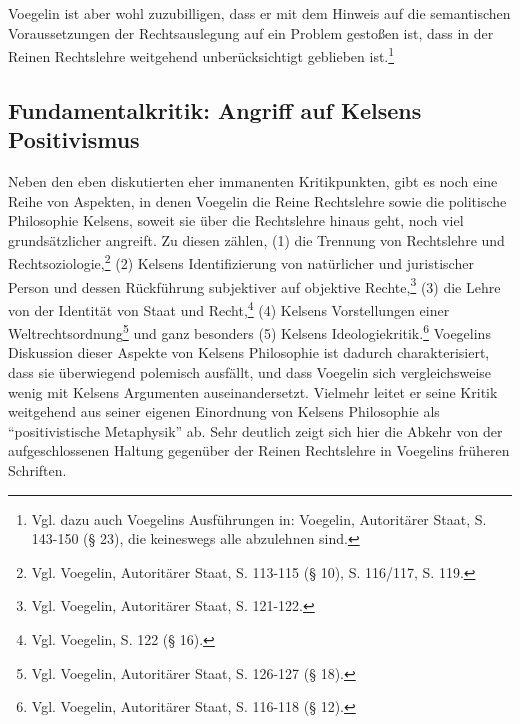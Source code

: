 \documentclass[12pt,a4paper,ngerman]{article}
\begin{document}
Voegelin ist aber wohl zuzubilligen, dass er mit dem Hinweis auf die
semantischen Voraussetzungen der Rechtsauslegung auf ein Problem gestoßen ist,
dass in der Reinen Rechtslehre weitgehend unberücksichtigt geblieben
ist.\footnote{Vgl. dazu auch Voegelins Ausführungen in: Voegelin, Autoritärer
  Staat, S.  143-150 (§ 23), die keineswegs alle abzulehnen sind.}

\subsection{Fundamentalkritik: Angriff auf Kelsens Positivismus}

Neben den eben diskutierten eher immanenten Kritikpunkten, gibt es noch eine
Reihe von Aspekten, in denen Voegelin die Reine Rechtslehre sowie die
politische Philosophie Kelsens, soweit sie über die Rechtslehre hinaus geht,
noch viel grundsätzlicher angreift. Zu diesen zählen, (1) die Trennung von
Rechtslehre und Rechtsoziologie,\footnote{Vgl. Voegelin, Autoritärer Staat, S.
  113-115 (§ 10), S. 116/117, S. 119.} (2) Kelsens Identifizierung von
natürlicher und juristischer Person und dessen Rückführung subjektiver auf
objektive Rechte,\footnote{Vgl. Voegelin, Autoritärer Staat, S. 121-122.} (3)
die Lehre von der Identität von Staat und Recht,\footnote{Vgl. Voegelin, S.
  122 (§ 16).}  (4) Kelsens Vorstellungen einer
Weltrechtsordnung\footnote{Vgl. Voegelin, Autoritärer Staat, S. 126-127 (§
  18).} und ganz besonders (5) Kelsens Ideologiekritik.\footnote{Vgl.
  Voegelin, Autoritärer Staat, S.  116-118 (§ 12).}  Voegelins Diskussion
dieser Aspekte von Kelsens Philosophie ist dadurch charakterisiert, dass sie
überwiegend polemisch ausfällt, und dass Voegelin sich vergleichsweise wenig
mit Kelsens Argumenten auseinandersetzt.  Vielmehr leitet er seine Kritik
weitgehend aus seiner eigenen Einordnung von Kelsens Philosophie als
"`positivistische Metaphysik"' ab. Sehr deutlich zeigt sich hier die Abkehr
von der aufgeschlossenen Haltung gegenüber der Reinen Rechtslehre in Voegelins
früheren Schriften.
\end{document}
